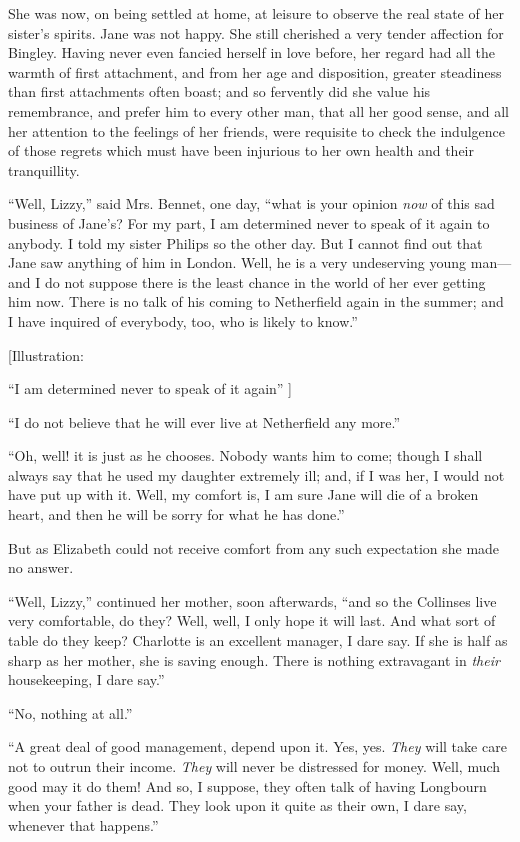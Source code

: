 \documentclass[12pt]{book}
\begin{document}
She was now, on being settled at home, at leisure to observe the real state of her sister's spirits. Jane was not happy. She still cherished a very tender affection for Bingley. Having never even fancied herself in love before, her regard had all the warmth of first attachment, and from her age and disposition, greater steadiness than first attachments often boast; and so fervently did she value his remembrance, and prefer him to every other man, that all her good sense, and all her attention to the feelings of her friends, were requisite to check the indulgence of those regrets which must have been injurious to her own health and their tranquillity.

``Well, Lizzy,'' said Mrs. Bennet, one day, ``what is your opinion \textit{now} of this sad business of Jane's? For my part, I am determined never to speak of it again to anybody. I told my sister Philips so the other day. But I cannot find out that Jane saw anything of him in London. Well, he is a very undeserving young man---and I do not suppose there is the least chance in the world of her ever getting him now. There is no talk of his coming to Netherfield again in the summer; and I have inquired of everybody, too, who is likely to know.''

[Illustration:

``I am determined never to speak of it again'' ]

``I do not believe that he will ever live at Netherfield any more.''

``Oh, well! it is just as he chooses. Nobody wants him to come; though I shall always say that he used my daughter extremely ill; and, if I was her, I would not have put up with it. Well, my comfort is, I am sure Jane will die of a broken heart, and then he will be sorry for what he has done.''

But as Elizabeth could not receive comfort from any such expectation she made no answer.

``Well, Lizzy,'' continued her mother, soon afterwards, ``and so the Collinses live very comfortable, do they? Well, well, I only hope it will last. And what sort of table do they keep? Charlotte is an excellent manager, I dare say. If she is half as sharp as her mother, she is saving enough. There is nothing extravagant in \textit{their} housekeeping, I dare say.''

``No, nothing at all.''

``A great deal of good management, depend upon it. Yes, yes. \textit{They} will take care not to outrun their income. \textit{They} will never be distressed for money. Well, much good may it do them! And so, I suppose, they often talk of having Longbourn when your father is dead. They look upon it quite as their own, I dare say, whenever that happens.''
\end{document}
